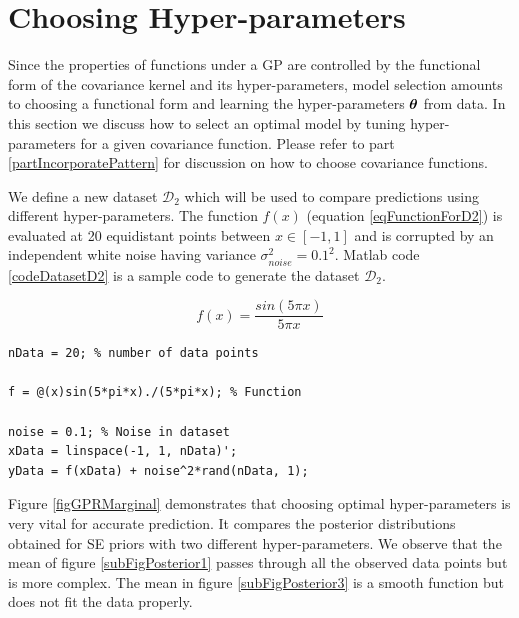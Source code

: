 \section{Choosing Hyper-parameters}\label{secHyperParameter}
Since the properties of functions under a GP are controlled by the functional form of the covariance kernel and its hyper-parameters, model selection amounts to choosing a functional form and learning the hyper-parameters $\boldsymbol{\theta}$ from data. In this section we discuss how to select an optimal model by tuning hyper-parameters for a given covariance function. Please refer to part \ref{partIncorporatePattern} for discussion on how to choose covariance functions. 

We define a new dataset $\mathcal{D}_{2}$ which will be used to compare predictions using different hyper-parameters. The function $f(x)$ (equation \ref{eqFunctionForD2}) is evaluated at 20 equidistant points between $x \in [-1, 1]$ and is corrupted by an independent white noise having variance $\sigma_{noise}^2 = 0.1^2$. Matlab code \ref{codeDatasetD2} is a sample code to generate the dataset  $\mathcal{D}_{2}$. 

\begin{equation}\label{eqFunctionForD2}
f(x) = \frac{sin(5 \pi x)}{5 \pi x}
\end{equation}

\begin{mdframed}[hidealllines=true,backgroundcolor=lightgray!20]
\begin{lstlisting}[caption={Code for dataset D2}, 
                    captionpos=b, 
                    label={codeDatasetD2},
                    style=Matlab-editor,
                    basicstyle=\color{black}\ttfamily\small,
                    backgroundcolor = \color{MatlabCellColour}]
nData = 20; % number of data points

f = @(x)sin(5*pi*x)./(5*pi*x); % Function

noise = 0.1; % Noise in dataset
xData = linspace(-1, 1, nData)';
yData = f(xData) + noise^2*rand(nData, 1);

\end{lstlisting}
\end{mdframed}

Figure \ref{figGPRMarginal} demonstrates that choosing optimal hyper-parameters is very vital for accurate prediction. It compares the posterior distributions obtained for SE priors with two different hyper-parameters. We observe that the mean of figure \ref{subFigPosterior1} passes through all the observed data points but is more complex. The mean in figure \ref{subFigPosterior3} is a smooth function but does not fit the data properly. 

